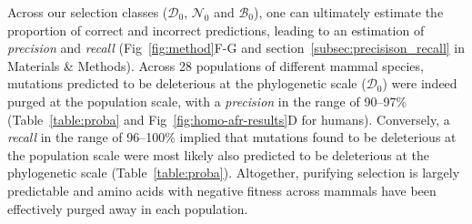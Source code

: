 \documentclass[10pt,letterpaper]{article}
\newcommand{\SphyDel}{\mathcal{D}_0}
\newcommand{\SphyNeu}{\mathcal{N}_0}
\newcommand{\SphyBen}{\mathcal{B}_0}
\begin{document}
Across our selection classes ($\SphyDel$, $\SphyNeu$ and $\SphyBen$), one can ultimately estimate the proportion of correct and incorrect predictions, leading to an estimation of \textit{precision} and \textit{recall} (Fig~\ref{fig:method}F-G and section~\ref{subsec:precisison_recall} in Materials \& Methods).
Across 28 populations of different mammal species, mutations predicted to be deleterious at the phylogenetic scale ($\SphyDel$) were indeed purged at the population scale, with a \textit{precision} in the range of 90--97\% (Table~\ref{table:proba} and Fig~\ref{fig:homo-afr-results}D for humans).
Conversely, a \textit{recall} in the range of 96--100\% implied that mutations found to be deleterious at the population scale were most likely also predicted to be deleterious at the phylogenetic scale (Table~\ref{table:proba}).
Altogether, purifying selection is largely predictable and amino acids with negative fitness across mammals have been effectively purged away in each population.
\end{document}
